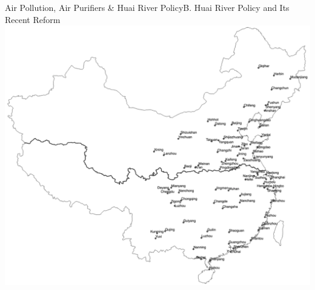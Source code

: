 \documentclass{beamer}
\begin{document}
\begin{frame}{Air Pollution, Air Purifiers \& Huai River Policy}{B. Huai River Policy and Its Recent Reform}
	\centering
	\includegraphics[scale=0.6]{figure1.png}
\end{frame}

\end{document}
